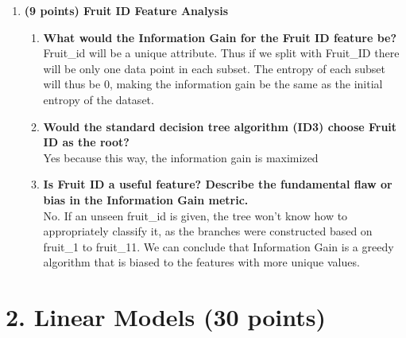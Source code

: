 \documentclass[12pt]{article}
\begin{document}
\begin{enumerate}[label=(\alph*)]
\begin{center}
\begin{tikzpicture}
\end{tikzpicture}
\end{center}
    
    \item \textbf{(9 points) Fruit ID Feature Analysis}
    \begin{enumerate}[label=\roman*.]
        \item \textbf{What would the Information Gain for the Fruit ID feature be?}
        \\
        Fruit\_id will be a unique attribute.
        Thus if we split with Fruit\_ID there will be only one data point in each subset.
        The entropy of each subset will thus be 0,
        making the information gain be the same as the initial entropy of the dataset.
        
        \item \textbf{Would the standard decision tree algorithm (ID3) choose Fruit ID as the root?}
        \\
        Yes because this way, the information gain is maximized
        
        \item \textbf{Is Fruit ID a useful feature? Describe the fundamental flaw or bias in the Information Gain metric.}
        \\
        No. If an unseen fruit\_id is given, the tree won't know how to appropriately classify it, 
        as the branches were constructed based on fruit\_1 to fruit\_11. 
        We can conclude that Information Gain is a greedy algorithm that is biased to the features with more unique values.


    \end{enumerate}
\end{enumerate}

\newpage
\section*{2. Linear Models (30 points)}
\end{document}
